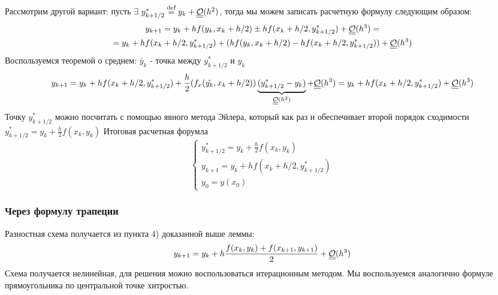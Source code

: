 Рассмотрим другой вариант: пусть $\exists\ y_{k+1/2}^*\defeq y_k+\bigO(h^2)$, тогда
мы можем записать расчетную формулу следующим образом:
\begin{multline*}
  y_{k+1}=y_{k}+hf(y_k, x_k+h/2)\pm hf(x_k+h/2,y_{k+1/2}^*)+\underline{\underline{\mathcal{O}}}(h^3)= \\
  = y_{k}+hf(x_k+h/2,y_{k+1/2}^*)+ (hf(y_k, x_k+h/2)-hf(x_k+h/2,y_{k+1/2}^*))+\underline{\underline{\mathcal{O}}}(h^3)
\end{multline*}
Воспользуемся теоремой о среднем: $\tilde{y_k}$ - точка между $y_{k+1/2}^*$ и $y_k$
\[y_{k+1}= y_{k}+hf(x_k+h/2,y_{k+1/2}^*)+ \frac{h}{2}(f_x(\tilde{y_k}, x_k+h/2))\underbrace{(y_{k+1/2}^*-y_k)}_{\underline{\underline{\mathcal{O}}}(h^2)}+\underline{\underline{\mathcal{O}}}(h^3)=y_{k}+hf(x_k+h/2,y_{k+1/2}^*)+\underline{\underline{\mathcal{O}}}(h^3)\]
Точку $y_{k+1/2}^*$ можно посчитать с помощью явного метода Эйлера,
который как раз и обеспечивает второй порядок сходимости $y_{k+1/2}^*=y_k+\frac{h}{2}f(x_k,y_k)$
Итоговая расчетная форумла
\[\begin{cases}
    y_{k+1/2}^*=y_k+\frac{h}{2}f(x_k,y_k) \\
    y_{k+1}=y_{k}+hf(x_k+h/2,y_{k+1/2}^*) \\
    y_0=y(x_0)
  \end{cases}\]

\subsubsection*{Через формулу трапеции}
Разностная схема получается из пункта 4) доказанной выше леммы:
\[y_{k+1}=y_k+h\frac{f(x_k,y_k)+f(x_{k+1},y_{k+1})}{2}+\underline{\underline{\mathcal{O}}}(h^3)\]
Схема получается нелинейная, для решения можно воспользоваться итерационным
методом. Мы воспользуемся аналогично формуле прямоугольника по центральной
точке хитростью.

